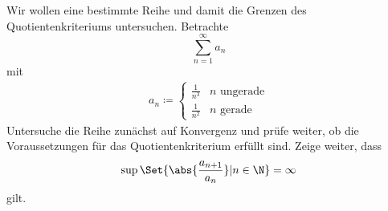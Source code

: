 \begin{exercise}
  Wir wollen eine bestimmte Reihe und damit die Grenzen des Quotientenkriteriums
  untersuchen. Betrachte
  \[
    \sum_{n=1}^\infty a_n
  \]
  mit
  \begin{align*}
    a_n \coloneqq
    \begin{cases}
      \frac{1}{n^3} & n \text{ ungerade} \\
      \frac{1}{n^2} & n  \text{ gerade}
    \end{cases}
  \end{align*}
  Untersuche die Reihe zunächst auf Konvergenz und prüfe weiter, ob die
  Voraussetzungen für das Quotientenkriterium erfüllt sind. Zeige weiter, dass
  \[
    \sup \Set{\abs{\frac{a_{n + 1}}{a_n}} | n \in \N}
    =
    \infty
  \]
  gilt.
\end{exercise}
